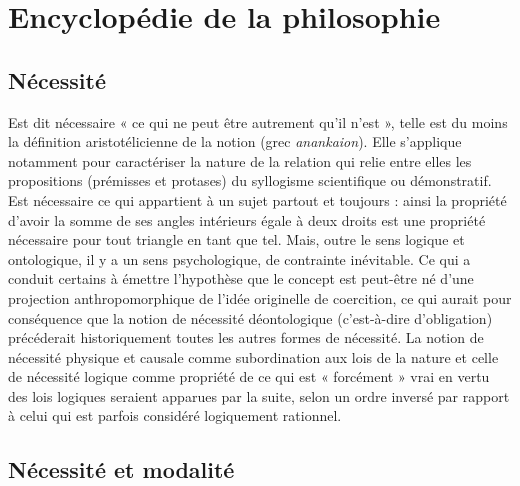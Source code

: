 
\section{Encyclopédie de la philosophie}
%
\subsection{Nécessité}
Est dit nécessaire « ce qui ne peut être autrement qu'il n'est »,
telle est du moins la définition aristotélicienne de la notion (grec {\it anankaion}).
Elle s'applique
notamment pour caractériser la nature de
la relation qui relie entre elles les propositions (prémisses et protases) du syllogisme scientifique ou démonstratif. Est
nécessaire ce qui appartient à un sujet
partout et toujours : ainsi la propriété
d’avoir la somme de ses angles intérieurs
égale à deux droits est une propriété
nécessaire pour tout triangle en tant que
tel. Mais, outre le sens logique et ontologique, il y a un sens psychologique, de
contrainte inévitable. Ce qui a conduit certains à émettre l'hypothèse que le concept
est peut-être né d’une projection anthropomorphique de l’idée originelle de coercition,
ce qui aurait pour conséquence que la
notion de nécessité déontologique (c’est-à-dire d’obligation) précéderait historiquement toutes les autres formes de nécessité.
La notion de nécessité physique et causale comme subordination aux lois de la
nature et celle de nécessité logique
comme propriété de ce qui est « forcément » vrai en vertu des lois logiques
seraient apparues par la suite, selon un
ordre inversé par rapport à celui qui est
parfois considéré logiquement rationnel.

\subsection{Nécessité et modalité}


